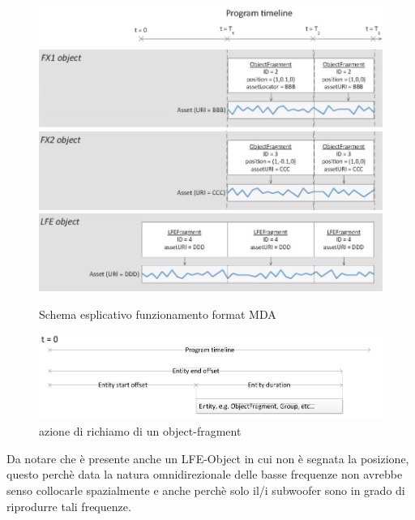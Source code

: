 \documentclass[12pt,a4paper]{report}
\begin{document}
\begin{figure}[htbp]
	\centering
	\includegraphics[scale=0.50]{figures/timeline.png}\\
	\includegraphics[scale=0.50]{figures/object1.png}\\
	\includegraphics[scale=0.50]{figures/object2.png}\\
	\includegraphics[scale=0.50]{figures/object3.png}
	\caption {Schema esplicativo funzionamento format MDA} 
	\label{fig:object}
	\end{figure}

\begin{figure}[htbp]
	\centering
	\includegraphics[scale=0.50]{figures/timeline2.png}
	
	\caption {azione di richiamo di un object-fragment} 
	\label{fig:time}
	\end{figure}

Da notare che è presente anche un LFE-Object in cui non è segnata la posizione, questo perchè data la natura omnidirezionale delle basse frequenze non avrebbe senso collocarle spazialmente e anche perchè solo il/i subwoofer sono in grado di riprodurre tali frequenze.
\end{document}
